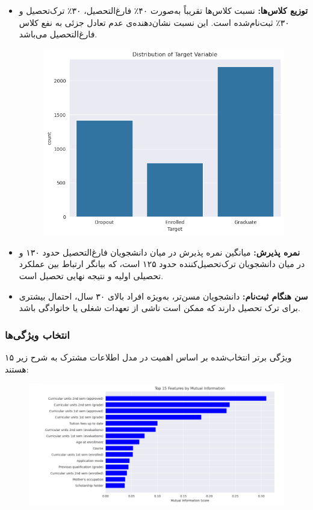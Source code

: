 \begin{itemize}
	\item \textbf{توزیع کلاس‌ها:} نسبت کلاس‌ها تقریباً به‌صورت ۴۰٪ فارغ‌التحصیل، ۳۰٪ ترک‌تحصیل و ۳۰٪ ثبت‌نام‌شده است. این نسبت نشان‌دهنده‌ی عدم تعادل جزئی به نفع کلاس فارغ‌التحصیل می‌باشد.
	\begin{figure}[H]
		\centering
		\includegraphics[width=0.7\linewidth]{img/head1}
		\caption[توزیع وضعیت تحصیلی‌ها]{}
		\label{fig:head1}
	\end{figure}
	
	\item \textbf{نمره پذیرش:} میانگین نمره پذیرش در میان دانشجویان فارغ‌التحصیل حدود ۱۳۰ و در میان دانشجویان ترک‌تحصیل‌کننده حدود ۱۲۵ است، که بیانگر ارتباط بین عملکرد تحصیلی اولیه و نتیجه نهایی تحصیل است.
	
	\item \textbf{سن هنگام ثبت‌نام:} دانشجویان مسن‌تر، به‌ویژه افراد بالای ۳۰ سال، احتمال بیشتری برای ترک تحصیل دارند که ممکن است ناشی از تعهدات شغلی یا خانوادگی باشد.
\end{itemize}

\subsubsection{انتخاب ویژگی‌ها}
۱۵ ویژگی برتر انتخاب‌شده بر اساس اهمیت در مدل اطلاعات مشترک به شرح زیر هستند:
\begin{figure}[H]
	\centering
	\includegraphics[width=0.7\linewidth]{img/mi}
	\caption[۱۵ ویژگی بر اساس ویژگی‌های مشترک]{}
	\label{fig:mi}
\end{figure}


